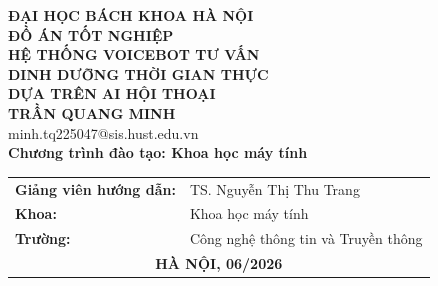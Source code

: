 \documentclass[a4paper,13pt,twoside]{report}
\makeatletter
\def\TITLELINEONE{HỆ THỐNG VOICEBOT TƯ VẤN}
\def\TITLELINETWO{DINH DƯỠNG THỜI GIAN THỰC}
\def\TITLELINETHREE{DỰA TRÊN AI HỘI THOẠI}
\def\AUTHOR{TRẦN QUANG MINH}
\def\STUDENTID{minh.tq225047@sis.hust.edu.vn}
\def\PROGRAM{Chương trình đào tạo: Khoa học máy tính}
\def\FACULTY{Khoa học máy tính}
\def\SCHOOL{Công nghệ thông tin và Truyền thông}
\def\UNIVERSITY{ĐẠI HỌC BÁCH KHOA HÀ NỘI}
\def\SUPERVISOR{TS. Nguyễn Thị Thu Trang}
\makeatother
\begin{document}
\begin{titlepage}
    \thispagestyle{empty}
    \begin{center}
        {\textbf{\large \UNIVERSITY}}\\[3.4cm]

        {\textbf{\huge ĐỒ ÁN TỐT NGHIỆP}}\\[0.9cm]
        {\textbf{\Large \TITLELINEONE}}\\[0.25cm]
        {\textbf{\Large \TITLELINETWO}}\\[0.25cm]
        {\textbf{\Large \TITLELINETHREE}}\\[0.9cm]

        {\textbf{\large \AUTHOR}}\\[-0.05cm]
        {\large \STUDENTID}\\[0.5cm]

        {\textbf{\large \PROGRAM}}

        \vspace{3.2cm}

        {\large
            \begin{tabular}{@{}ll@{}}
                \textbf{Giảng viên hướng dẫn:} & \SUPERVISOR \\[0.5cm]
                \textbf{Khoa:}                 & \FACULTY    \\[0.5cm]
                \textbf{Trường:}               & \SCHOOL     \\[4.0cm]
                \multicolumn{2}{c}{\textbf{HÀ NỘI, 06/2026}}
            \end{tabular}
        }
    \end{center}
\end{titlepage}
\end{document}
